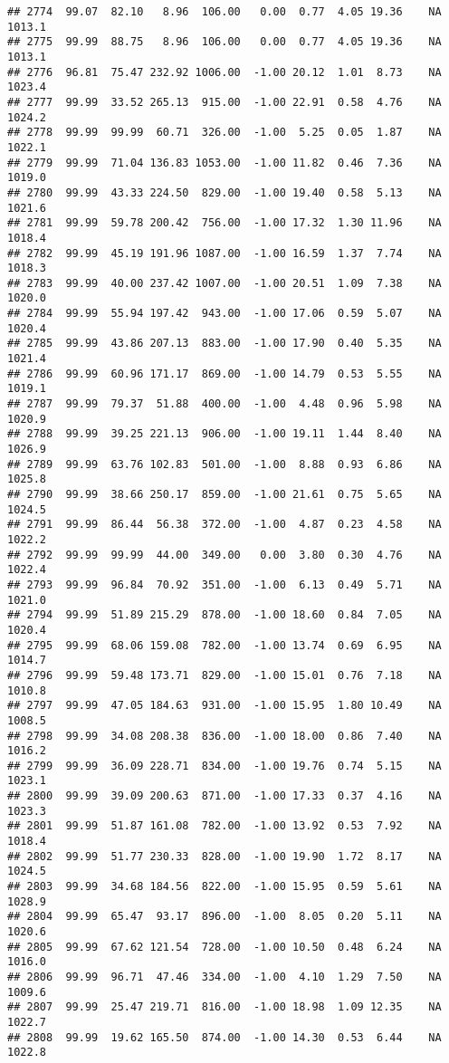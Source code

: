 \documentclass{article}\usepackage{graphicx, color}
\makeatletter
\newenvironment{kframe}{%
 \def\at@end@of@kframe{}%
 \ifinner\ifhmode%
  \def\at@end@of@kframe{\end{minipage}}%
  \begin{minipage}{\columnwidth}%
 \fi\fi%
 \def\FrameCommand##1{\hskip\@totalleftmargin \hskip-\fboxsep
 \colorbox{shadecolor}{##1}\hskip-\fboxsep
     \hskip-\linewidth \hskip-\@totalleftmargin \hskip\columnwidth}%
 \MakeFramed {\advance\hsize-\width
   \@totalleftmargin\z@ \linewidth\hsize
   \@setminipage}}%
 {\par\unskip\endMakeFramed%
 \at@end@of@kframe}
\newenvironment{knitrout}{}{} %
\makeatother
\begin{document}
\begin{knitrout}
\begin{kframe}
\begin{verbatim}
## 2774  99.07  82.10   8.96  106.00   0.00  0.77  4.05 19.36    NA 1013.1
## 2775  99.99  88.75   8.96  106.00   0.00  0.77  4.05 19.36    NA 1013.1
## 2776  96.81  75.47 232.92 1006.00  -1.00 20.12  1.01  8.73    NA 1023.4
## 2777  99.99  33.52 265.13  915.00  -1.00 22.91  0.58  4.76    NA 1024.2
## 2778  99.99  99.99  60.71  326.00  -1.00  5.25  0.05  1.87    NA 1022.1
## 2779  99.99  71.04 136.83 1053.00  -1.00 11.82  0.46  7.36    NA 1019.0
## 2780  99.99  43.33 224.50  829.00  -1.00 19.40  0.58  5.13    NA 1021.6
## 2781  99.99  59.78 200.42  756.00  -1.00 17.32  1.30 11.96    NA 1018.4
## 2782  99.99  45.19 191.96 1087.00  -1.00 16.59  1.37  7.74    NA 1018.3
## 2783  99.99  40.00 237.42 1007.00  -1.00 20.51  1.09  7.38    NA 1020.0
## 2784  99.99  55.94 197.42  943.00  -1.00 17.06  0.59  5.07    NA 1020.4
## 2785  99.99  43.86 207.13  883.00  -1.00 17.90  0.40  5.35    NA 1021.4
## 2786  99.99  60.96 171.17  869.00  -1.00 14.79  0.53  5.55    NA 1019.1
## 2787  99.99  79.37  51.88  400.00  -1.00  4.48  0.96  5.98    NA 1020.9
## 2788  99.99  39.25 221.13  906.00  -1.00 19.11  1.44  8.40    NA 1026.9
## 2789  99.99  63.76 102.83  501.00  -1.00  8.88  0.93  6.86    NA 1025.8
## 2790  99.99  38.66 250.17  859.00  -1.00 21.61  0.75  5.65    NA 1024.5
## 2791  99.99  86.44  56.38  372.00  -1.00  4.87  0.23  4.58    NA 1022.2
## 2792  99.99  99.99  44.00  349.00   0.00  3.80  0.30  4.76    NA 1022.4
## 2793  99.99  96.84  70.92  351.00  -1.00  6.13  0.49  5.71    NA 1021.0
## 2794  99.99  51.89 215.29  878.00  -1.00 18.60  0.84  7.05    NA 1020.4
## 2795  99.99  68.06 159.08  782.00  -1.00 13.74  0.69  6.95    NA 1014.7
## 2796  99.99  59.48 173.71  829.00  -1.00 15.01  0.76  7.18    NA 1010.8
## 2797  99.99  47.05 184.63  931.00  -1.00 15.95  1.80 10.49    NA 1008.5
## 2798  99.99  34.08 208.38  836.00  -1.00 18.00  0.86  7.40    NA 1016.2
## 2799  99.99  36.09 228.71  834.00  -1.00 19.76  0.74  5.15    NA 1023.1
## 2800  99.99  39.09 200.63  871.00  -1.00 17.33  0.37  4.16    NA 1023.3
## 2801  99.99  51.87 161.08  782.00  -1.00 13.92  0.53  7.92    NA 1018.4
## 2802  99.99  51.77 230.33  828.00  -1.00 19.90  1.72  8.17    NA 1024.5
## 2803  99.99  34.68 184.56  822.00  -1.00 15.95  0.59  5.61    NA 1028.9
## 2804  99.99  65.47  93.17  896.00  -1.00  8.05  0.20  5.11    NA 1020.6
## 2805  99.99  67.62 121.54  728.00  -1.00 10.50  0.48  6.24    NA 1016.0
## 2806  99.99  96.71  47.46  334.00  -1.00  4.10  1.29  7.50    NA 1009.6
## 2807  99.99  25.47 219.71  816.00  -1.00 18.98  1.09 12.35    NA 1022.7
## 2808  99.99  19.62 165.50  874.00  -1.00 14.30  0.53  6.44    NA 1022.8

\end{verbatim}
\end{kframe}
\end{knitrout}
\end{document}
